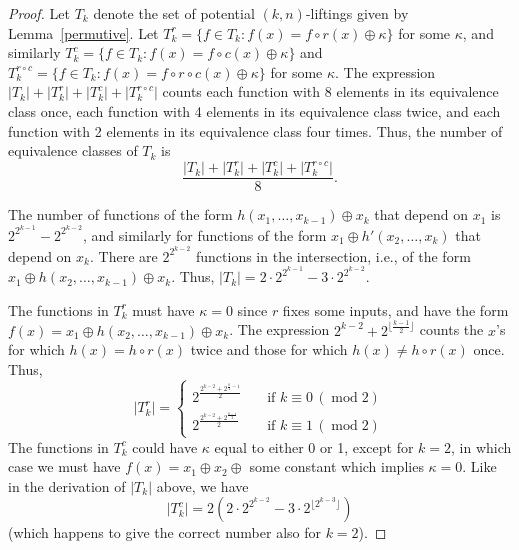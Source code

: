 \documentclass[11pt,english,a4paper]{amsart}
\theoremstyle{plain}
\theoremstyle{definition}
\theoremstyle{remark}
\begin{document}
    \begin{proof}
    Let $T_k$ denote the set of potential $(k, n)$-liftings given by Lemma~\ref{permutive}. Let $T^r_k = \{ f \in T_k : f(x) = f \circ r(x) \oplus \kappa\}$ for some $\kappa$, and similarly $T^c_k = \{ f \in T_k : f(x) = f \circ c(x) \oplus \kappa\}$ and $T^{r \circ c}_k = \{ f \in T_k : f(x) = f \circ r \circ c(x) \oplus \kappa\}$ for some $\kappa$. The expression $\lvert T_k\rvert + \lvert T^r_k\rvert + \lvert T^c_k\rvert + \lvert T^{r \circ c}_k\rvert$ counts each function with 8 elements in its equivalence class once, each function with 4 elements in its equivalence class twice, and each function with 2 elements in its equivalence class four times. Thus, the number of equivalence classes of $T_k$ is $$\frac{\lvert T_k\rvert + \lvert T^r_k\rvert + \lvert T^c_k\rvert + \lvert T^{r \circ c}_k\rvert}{8}.$$
    
    The number of functions of the form $h(x_1, \dotsc, x_{k-1}) \oplus x_k$ that depend on $x_1$ is $2^{2^{k-1}} - 2^{2^{k-2}}$, and similarly for functions of the form $x_1 \oplus h'(x_2, \dotsc, x_k)$ that depend on $x_k$. There are $2^{2^{k-2}}$ functions in the intersection, i.e., of the form $x_1 \oplus h(x_2, \dotsc,  x_{k-1}) \oplus x_k$. Thus, $\lvert T_k\rvert = 2 \cdot 2^{2^{k-1}} - 3 \cdot 2^{2^{k-2}}$.
    
    The functions in $T^r_k$ must have $\kappa=0$ since $r$ fixes some inputs, and have the form $f(x) = x_1 \oplus h(x_2, \dotsc, x_{k-1}) \oplus x_k$. The expression $2^{k-2} + 2^{\lfloor \frac{k-1}{2}\rfloor}$ counts the $x$'s for which $h(x) = h \circ r(x)$ twice and those for which $h(x) \neq h \circ r(x)$ once. Thus,
    \[
    \lvert T^r_k\rvert=
    \begin{cases}
        2^{\frac{2^{k-2} + 2^{\frac{k}{2}-1}}{2}} &\quad\text{if }k \equiv 0\, (\operatorname{mod} 2)\\
        2^{\frac{2^{k-2} + 2^{\frac{k-1}{2}}}{2}} &\quad\text{if }k \equiv 1\, (\operatorname{mod} 2)
    \end{cases}
    \]
    The functions in $T^c_k$ could have $\kappa$ equal to either 0 or 1, except for $k=2$, in which case we must have $f(x) = x_1 \oplus x_2 \oplus $ some constant which implies $\kappa=0$. Like in the derivation of $\lvert T_k\rvert$ above, we have $$\lvert T^c_k\rvert = 2 \left( 2 \cdot 2^{2^{k-2}} - 3 \cdot 2^{\lfloor 2^{k-3} \rfloor} \right)$$ (which happens to give the correct number also for $k=2$).
    

\end{proof}
\end{document}
